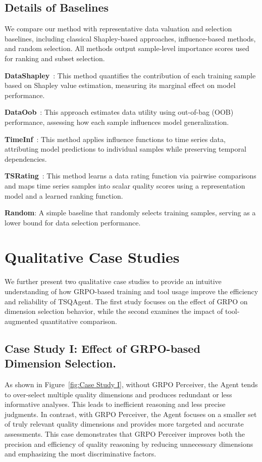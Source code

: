 \documentclass{article}
\begin{document}
\subsection{Details of Baselines}
\label{subsec:baseline}

We compare our method with representative data valuation and selection baselines, including classical Shapley-based approaches, influence-based methods, and random selection. All methods output sample-level importance scores used for ranking and subset selection.

\textbf{DataShapley}~\citep{ghorbani2019data}: This method quantifies the contribution of each training sample based on Shapley value estimation, measuring its marginal effect on model performance.

\textbf{DataOob}~\citep{kwon2024datainf}: This approach estimates data utility using out-of-bag (OOB) performance, assessing how each sample influences model generalization.

\textbf{TimeInf}~\citep{zhang2025timeinf}: This method applies influence functions to time series data, attributing model predictions to individual samples while preserving temporal dependencies.

\textbf{TSRating}~\citep{wu2026rating}: This method learns a data rating function via pairwise comparisons and maps time series samples into scalar quality scores using a representation model and a learned ranking function.

\textbf{Random}: A simple baseline that randomly selects training samples, serving as a lower bound for data selection performance.


\raggedbottom

\section{Qualitative Case Studies}
\label{app:case_study}

We further present two qualitative case studies to provide an intuitive understanding of how GRPO-based training and tool usage improve the efficiency and reliability of TSQAgent. The first study focuses on the effect of GRPO on dimension selection behavior, while the second examines the impact of tool-augmented quantitative comparison.

\subsection{Case Study I: Effect of GRPO-based Dimension Selection.}
As shown in Figure~\ref{fig:Case Study I},  without GRPO Perceiver, the Agent tends to over-select multiple quality dimensions and produces redundant or less informative analyses. This leads to inefficient reasoning and less precise judgments.
In contrast, with GRPO Perceiver, the Agent focuses on a smaller set of truly relevant quality dimensions and provides more targeted and accurate assessments.
This case demonstrates that GRPO Perceiver improves both the precision and efficiency of quality reasoning by reducing unnecessary dimensions and emphasizing the most discriminative factors.
\end{document}

